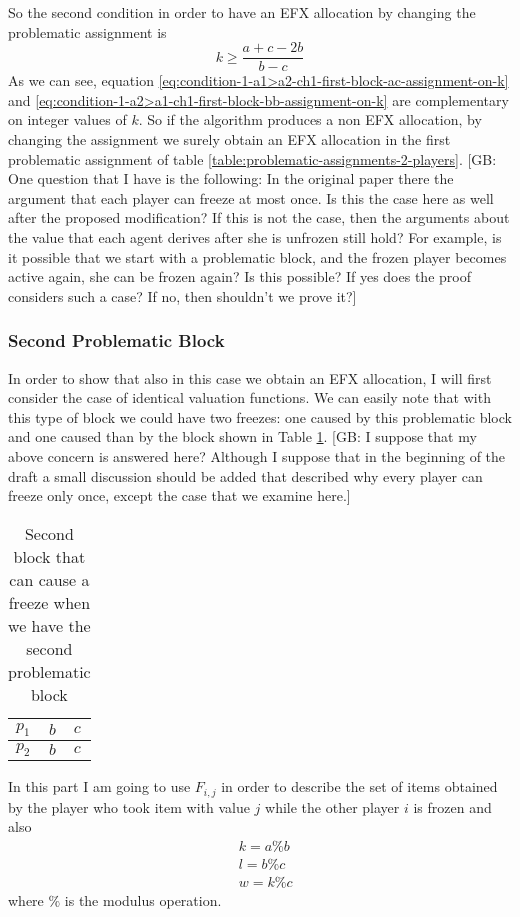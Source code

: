 \documentclass{article}
\newcommand{\gb}[1]{{\color{red}[GB: #1]}}
\begin{document}
So the second condition in order to have an EFX allocation by changing the problematic assignment is 
\begin{equation}
    k \ge \frac{a + c -2b}{b-c}
    \label{eq:condition-1-a2>a1-ch1-first-block-bb-assignment-on-k}
\end{equation}
As we can see, equation \ref{eq:condition-1-a1>a2-ch1-first-block-ac-assignment-on-k} and \ref{eq:condition-1-a2>a1-ch1-first-block-bb-assignment-on-k} are complementary on integer values of $k$. So if the algorithm produces a non EFX allocation, by changing the assignment we surely obtain an EFX allocation in the first problematic assignment of table \ref{table:problematic-assignments-2-players}. 
\gb{One question that I have is the following: In the original paper there the argument that each player can freeze at most once. Is this the case here as well after the proposed modification? If this is not the case, then the arguments about the value that each agent derives after she is unfrozen still hold? For example, is it possible that we start with a problematic block, and the frozen player becomes active again, she can be frozen again? Is this possible? If yes does the proof considers such a case? If no, then shouldn't we prove it?}



\subsubsection{Second Problematic Block}
In order to show that also in this case we obtain an EFX allocation, I will first consider the case of identical valuation functions. We can easily note that with this type of block we could have two freezes: one caused by this problematic block and one caused than by the block shown in Table \ref{table:bbcc-block}.
\gb{I suppose that my above concern is answered here? Although I suppose that in the beginning of the draft a small discussion should be added that described why every player can freeze only once, except the case that we examine here.}
\begin{table}[h]
        \centering
        \begin{tabular}{|l|l|l|}
            \hline
            $p_1$ & $b$ & $c$ \\ \hline
            $p_2$ & $b$ & $c$ \\ \hline
        \end{tabular}
        
        \caption{Second block that can cause a freeze when we have the second problematic block}
        \label{table:bbcc-block}
    \end{table}
In this part I am going to use $F_{i,j}$ in order to describe the set of items obtained by the player who took item with value $j$ while the other player $i$ is frozen and also
\begin{align*}
    &k = a\% b\\
    &l = b \% c\\
    &w = k \% c
\end{align*}
where $\%$ is the modulus operation.
\end{document}
